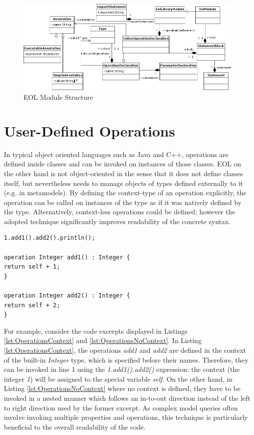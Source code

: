 \begin{figure}
  \centering
  \includegraphics[width=\textwidth,height=\textheight,keepaspectratio]{images/EOLModule.png}
  \caption{EOL Module Structure}
  \label{fig:EOL.Module}
\end{figure}


\newpage
\section{User-Defined Operations}
\label{sec:Design.EOL.Operations}

In typical object oriented languages such as Java and C++, operations are defined inside classes and can be invoked on instances of those classes. EOL on the other hand is not object-oriented in the sense that it does not define classes itself, but nevertheless needs to manage objects of types defined externally to it (e.g. in metamodels). By defining the context-type of an operation explicitly, the operation can be called on instances of the type as if it was natively defined by the type. Alternatively, context-less operations could be defined; however the adopted technique significantly improves readability of the concrete syntax.

\begin{lstlisting}[float=h, caption={Context-defining EOL operations}, label=lst:OperationsContext, language=EOL]
1.add1().add2().println();

operation Integer add1() : Integer {
return self + 1;
}

operation Integer add2() : Integer {
return self + 2;
}
\end{lstlisting}

For example, consider the code excerpts displayed in Listings \ref{lst:OperationsContext} and \ref{lst:OperationsNoContext}. In Listing \ref{lst:OperationsContext}, the operations \emph{add1} and \emph{add2} are defined in the context of the built-in \emph{Integer} type, which is specified before their names. Therefore, they can be invoked in line 1 using the \emph{1.add1().add2()} expression: the context (the integer \emph{1}) will be assigned to the special variable \emph{self}. On the other hand, in Listing \ref{lst:OperationsNoContext} where no context is defined, they have to be invoked in a nested manner which follows an in-to-out direction instead of the left to right direction used by the former excerpt. As complex model queries often involve invoking multiple properties and operations, this technique is particularly beneficial to the overall readability of the code.

